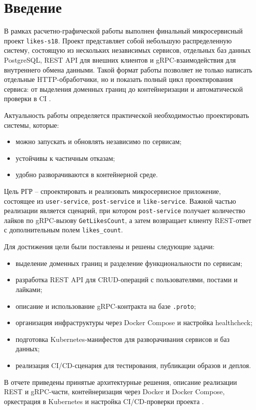\chapter*{Введение}

В рамках расчетно-графической работы выполнен финальный микросервисный проект
\texttt{likes-s18}. Проект представляет собой небольшую распределенную систему, состоящую из
нескольких независимых сервисов, отдельных баз данных PostgreSQL, REST API для внешних клиентов
и gRPC-взаимодействия для внутреннего обмена данными. Такой формат работы позволяет не только
написать отдельные HTTP-обработчики, но и показать полный цикл проектирования сервиса: от
выделения доменных границ до контейнеризации и автоматической проверки в CI \cite{fastapi_docs,grpc_docs}.

Актуальность работы определяется практической необходимостью проектировать системы, которые:
\begin{itemize}
    \item можно запускать и обновлять независимо по сервисам;
    \item устойчивы к частичным отказам;
    \item удобно разворачиваются в контейнерной среде.
\end{itemize}

Цель РГР -- спроектировать и реализовать микросервисное приложение, состоящее из
\texttt{user-service}, \texttt{post-service} и \texttt{like-service}. Важной частью реализации
является сценарий, при котором \texttt{post-service} получает количество лайков по gRPC-вызову
\texttt{GetLikesCount}, а затем возвращает клиенту REST-ответ с дополнительным полем
\texttt{likes\_count}.

Для достижения цели были поставлены и решены следующие задачи:
\begin{itemize}
    \item выделение доменных границ и разделение функциональности по сервисам;
    \item разработка REST API для CRUD-операций с пользователями, постами и лайками;
    \item описание и использование gRPC-контракта на базе \texttt{.proto};
    \item организация инфраструктуры через Docker Compose и настройка healthcheck;
    \item подготовка Kubernetes-манифестов для разворачивания сервисов и баз данных;
    \item реализация CI/CD-сценария для тестирования, публикации образов и деплоя.
\end{itemize}

В отчете приведены принятые архитектурные решения, описание реализации REST и gRPC-части,
контейнеризация через Docker и Docker Compose, оркестрация в Kubernetes и настройка CI/CD-проверки
проекта \cite{week17_readme,week17_arch,kubernetes_docs,github_actions_docs}.
